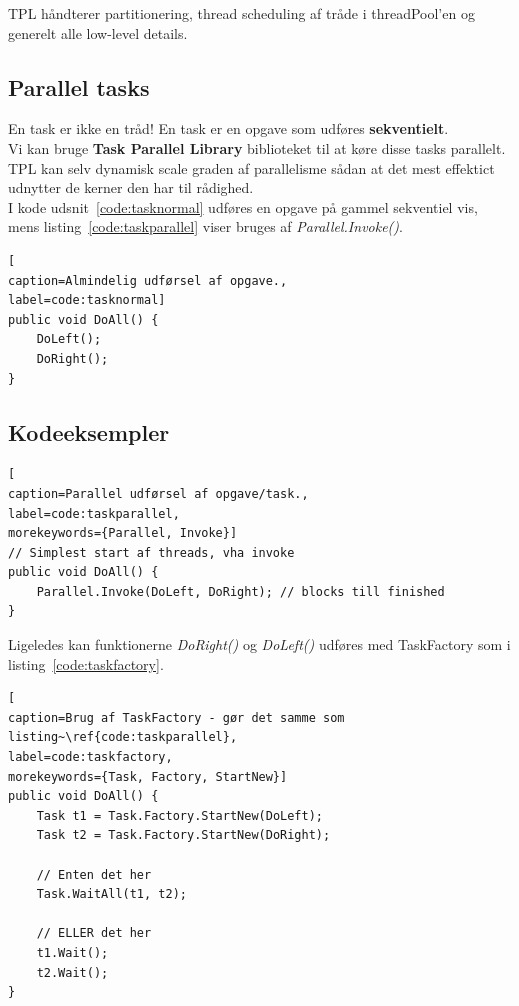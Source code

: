 TPL håndterer partitionering, thread scheduling af tråde i threadPool'en og generelt alle low-level details.

\subsection{Parallel tasks}

En task er ikke en tråd! En task er en opgave som udføres \textbf{sekventielt}.\\

Vi kan bruge \textbf{Task Parallel Library} biblioteket til at køre disse tasks parallelt. TPL kan selv dynamisk scale graden af parallelisme sådan at det mest effektict udnytter de kerner den har til rådighed.\\

I kode udsnit~\ref{code:tasknormal} udføres en opgave på gammel sekventiel vis, mens listing~\ref{code:taskparallel} viser bruges af \textit{Parallel.Invoke()}.

\begin{lstlisting}[
caption=Almindelig udførsel af opgave.,
label=code:tasknormal]
public void DoAll() {
	DoLeft();
	DoRight();
}
\end{lstlisting}

\subsection{Kodeeksempler}

\begin{lstlisting}[
caption=Parallel udførsel af opgave/task.,
label=code:taskparallel,
morekeywords={Parallel, Invoke}]
// Simplest start af threads, vha invoke
public void DoAll() {
	Parallel.Invoke(DoLeft, DoRight); // blocks till finished
}
\end{lstlisting}

Ligeledes kan funktionerne \textit{DoRight()} og \textit{DoLeft()} udføres med TaskFactory som i listing~\ref{code:taskfactory}.

\begin{lstlisting}[
caption=Brug af TaskFactory - gør det samme som listing~\ref{code:taskparallel},
label=code:taskfactory,
morekeywords={Task, Factory, StartNew}]
public void DoAll() {
	Task t1 = Task.Factory.StartNew(DoLeft);
	Task t2 = Task.Factory.StartNew(DoRight);
	
	// Enten det her
	Task.WaitAll(t1, t2);
	
	// ELLER det her
	t1.Wait();
	t2.Wait();
}
\end{lstlisting}

